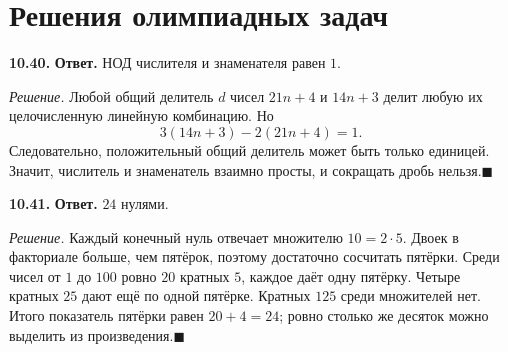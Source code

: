 \documentclass[12pt,a4paper,oneside,openany]{book}
\theoremstyle{colordef}\newtheorem{definition}{Определение}[chapter]
\theoremstyle{plain}\newtheorem{theorem}{Теорема}[chapter]
\theoremstyle{definition}\newtheorem{axiom}{Аксиома}[chapter]
\begin{document}
\ifdim\dimexpr\ht\CatFlowBox+\dp\CatFlowBox\relax<64mm\dp\CatFlowBox=\dimexpr64mm-\ht\CatFlowBox\relax\fi%
\noindent\usebox{\CatFlowBox}\par\addvspace{5pt}

\par{}\section*{Решения олимпиадных задач}
\textbf{10.40.} \textbf{Ответ.} НОД числителя и знаменателя равен \(1\).\par\nopagebreak[4]\textit{Решение.} Любой общий делитель \(d\) чисел \(21n+4\) и \(14n+3\) делит любую их целочисленную линейную комбинацию. Но \[3(14n+3)-2(21n+4)=1.\] Следовательно, положительный общий делитель может быть только единицей. Значит, числитель и знаменатель взаимно просты, и сокращать дробь нельзя.\hfill\(\blacksquare\)\par
\textbf{10.41.} \textbf{Ответ.} \(24\) нулями.\par\nopagebreak[4]\textit{Решение.} Каждый конечный нуль отвечает множителю \(10=2\cdot5\). Двоек в факториале больше, чем пятёрок, поэтому достаточно сосчитать пятёрки. Среди чисел от \(1\) до \(100\) ровно \(20\) кратных \(5\), каждое даёт одну пятёрку. Четыре кратных \(25\) дают ещё по одной пятёрке. Кратных \(125\) среди множителей нет. Итого показатель пятёрки равен \(20+4=24\); ровно столько же десяток можно выделить из произведения.\hfill\(\blacksquare\)\par
\endgroup
\end{document}
